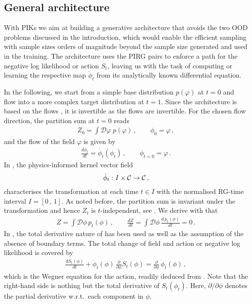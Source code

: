 \documentclass[reprint,amsmath,amssymb,aps,pra,superscriptaddress,nofootinbib,twocolumn,floatfix,nolongbibliography]{revtex4-2}
\begin{document}
\subsection{General architecture}
\label{sec:GenArchitecture} 

With PIKs we aim at building a generative architecture that avoids the two OOD problems discussed in the introduction, which would enable the efficient sampling with sample sizes orders of magnitude beyond the sample size generated and used in the training. The architecture uses the PIRG pairs to enforce a path for the negative log likelihood or action $S_t$, leaving us with the task of computing or learning the respective map $\dot\phi_t$ from its analytically known differential equation.

In the following, we start from a simple base distribution $p(\varphi)$ at $t=0$ and flow into a more complex target distribution at $t=1$. Since the architecture is based on the flows , it is invertible as the flows are invertible. For the chosen flow direction, the partition sum at $t=0$ reads 
%
\begin{align}
    Z_0 = \int \mathcal{D}\varphi \; p(\varphi)\,,\qquad \phi_{0} = \varphi\,, 
  \label{eq:BaseDistribution}
\end{align}
%
and the flow of the field $\varphi$ is given by 
%
\begin{align}
    \frac{d\phi_t}{dt} = \dot{\phi_t}(\phi_t)\,, \qquad \phi_{t=0} = \varphi\,. 
\label{eq:FieldODE}
\end{align}
%
In , the physics-informed kernel vector field 
%
\begin{align} 
\dot{\phi}_t: I \times {\cal C}\to {\cal C}\,, 
\label{eq:dotPhi} 
\end{align} 
% 
characterises the transformation at each time $t\in I$ with the normalised RG-time interval $I=[0\,,\,1]$. As noted before, the partition sum is invariant under the transformation  and hence $Z_t$ is $t$-independent, see . We derive with  that 
%
\begin{align}
    Z = \int \mathcal{D}\phi \,p_t(\phi)\,, \qquad \frac{ d Z}{dt} =  \int \mathcal{D}\phi \,\frac{ d \,p_t(\phi)}{dt}=0\,. 
\label{eq:WegnerEvolutionIntegrand}
\end{align}
%
In , the total derivative nature of  has been used as well as the assumption of the absence of boundary terms. The total change of field and action or negative log likelihood is covered by 
%
\begin{align}
	\frac{d S_t(\phi)  }{dt} +\dot{\phi}_t(\phi) \,\frac{\partial}{\partial \phi} S_t(\phi)= \frac{\partial}{\partial \phi} \, \dot{\phi}_t(\phi) \,,
	\label{eq:WF-dotphi}
\end{align}
%
which is the Wegner equation for the action, readily deduced from . Note that the right-hand side is nothing but the total derivative of $S_t(\phi_t)$. Here, $\partial/\partial\phi$ denotes the partial derivative w.r.t.\ each component in $\phi$.
\end{document}
